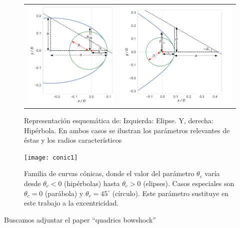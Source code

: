 \begin{figure}
  \begin{tabular}{cc}
    \includegraphics[width=0.5\linewidth]{./Figures/ellipse_edited} &
    \includegraphics[width=0.5\linewidth]{./Figures/hyperbola_edited}
  \end{tabular}
  \label{fig:conics}
  \caption{Representación esquemática de: Izquierda: Elipse. Y, derecha: Hipérbola.
  En ambos casos se ilustran los parámetros relevantes de éstas y los radios característicos}
\end{figure}

\begin{figure}
  \texttt{[image: conic1]}
  \label{fig:conics-family}
  \caption{Familia de curvas cónicas, donde el valor del parámetro $\theta_c$ varía desde
    $\theta_c <0$ (hipérbolas) hasta $\theta_c > 0$ (elipses). Casos especiales son $\theta_c = 0$
  (parábola) y $\theta_c = 45^\circ$ (círculo). Este parámetro sustituye en este trabajo a la excentricidad.}
\end{figure}


Buscamos adjuntar el paper ``quadrics bowshock''
